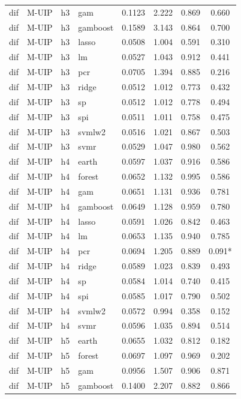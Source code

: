 \begin{ThreePartTable}
\begin{longtable}[t]{llclcccc}
dif & M-UIP & h3 & gam & 0.1123 & 2.222 & 0.869 & 0.660\\
dif & M-UIP & h3 & gamboost & 0.1589 & 3.143 & 0.864 & 0.700\\
dif & M-UIP & h3 & lasso & 0.0508 & 1.004 & 0.591 & 0.310\\
dif & M-UIP & h3 & lm & 0.0527 & 1.043 & 0.912 & 0.441\\
dif & M-UIP & h3 & pcr & 0.0705 & 1.394 & 0.885 & 0.216\\
dif & M-UIP & h3 & ridge & 0.0512 & 1.012 & 0.773 & 0.432\\
dif & M-UIP & h3 & sp & 0.0512 & 1.012 & 0.778 & 0.494\\
dif & M-UIP & h3 & spi & 0.0511 & 1.011 & 0.758 & 0.475\\
dif & M-UIP & h3 & svmlw2 & 0.0516 & 1.021 & 0.867 & 0.503\\
dif & M-UIP & h3 & svmr & 0.0529 & 1.047 & 0.980 & 0.562\\
\addlinespace
dif & M-UIP & h4 & earth & 0.0597 & 1.037 & 0.916 & 0.586\\
dif & M-UIP & h4 & forest & 0.0652 & 1.132 & 0.995 & 0.586\\
dif & M-UIP & h4 & gam & 0.0651 & 1.131 & 0.936 & 0.781\\
dif & M-UIP & h4 & gamboost & 0.0649 & 1.128 & 0.959 & 0.780\\
dif & M-UIP & h4 & lasso & 0.0591 & 1.026 & 0.842 & 0.463\\
dif & M-UIP & h4 & lm & 0.0653 & 1.135 & 0.940 & 0.785\\
dif & M-UIP & h4 & pcr & 0.0694 & 1.205 & 0.889 & 0.091*\\
dif & M-UIP & h4 & ridge & 0.0589 & 1.023 & 0.839 & 0.493\\
dif & M-UIP & h4 & sp & 0.0584 & 1.014 & 0.740 & 0.415\\
dif & M-UIP & h4 & spi & 0.0585 & 1.017 & 0.790 & 0.502\\
dif & M-UIP & h4 & svmlw2 & 0.0572 & 0.994 & 0.358 & 0.152\\
dif & M-UIP & h4 & svmr & 0.0596 & 1.035 & 0.894 & 0.514\\
\addlinespace
dif & M-UIP & h5 & earth & 0.0655 & 1.032 & 0.812 & 0.182\\
dif & M-UIP & h5 & forest & 0.0697 & 1.097 & 0.969 & 0.202\\
dif & M-UIP & h5 & gam & 0.0956 & 1.507 & 0.906 & 0.871\\
dif & M-UIP & h5 & gamboost & 0.1400 & 2.207 & 0.882 & 0.866\\

\end{longtable}
\end{ThreePartTable}
